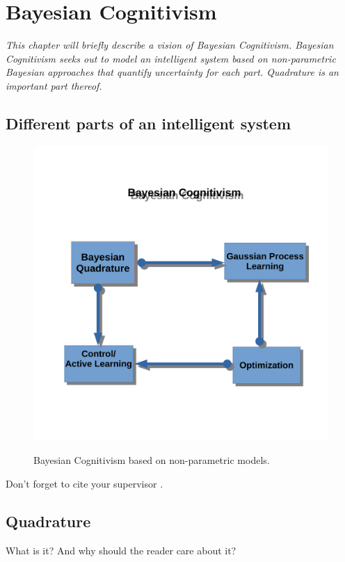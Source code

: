 \documentclass[oneside, 11pt]{book}
\begin{document}
\chapter{Bayesian Cognitivism}
\emph{This chapter will briefly describe a vision of Bayesian Cognitivism. Bayesian Cognitivism seeks out to model an intelligent system based on non-parametric Bayesian approaches that quantify uncertainty for each part. Quadrature is an important part thereof.}
\section{Different parts of an intelligent system}
\begin{figure}
\caption{Bayesian Cognitivism based on non-parametric models.}
\label{dense}
  \centering
    \includegraphics[scale=0.6]{bayescog.pdf}
 \label{denseb}
\end{figure}
Don't forget to cite your supervisor \citep{schulz2015learning}.
\section{Quadrature}
What is it? And why should the reader care about it?

\end{document}
